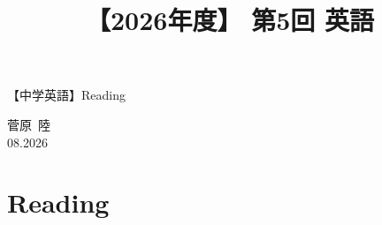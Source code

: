 \documentclass[12pt,a4paper]{jsarticle}
\title{【2026年度】 第5回 英語}                %
\author{}                     %
\date{}                       %
\begin{document}
\begin{center}
{\LARGE 【中学英語】Reading}
\end{center}

\begin{flushright}
  菅原\ 陸\\
  08.2026
\end{flushright}


\section{Reading}


\end{document}
